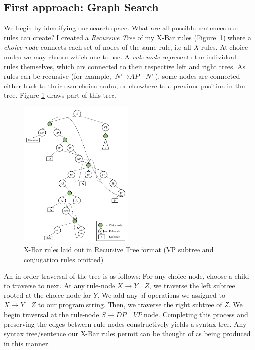 \documentclass[runningheads]{llncs}
\begin{document}
\subsection{First approach: Graph Search}
We begin by identifying our search space. What are all possible sentences our rules can create? I created a \textit{Recursive Tree} of my X-Bar rules (Figure~\ref{fig:rule-tree}) where a \textit{choice-node} connects each set of nodes of the same rule, i.e all $X$ rules. At choice-nodes we may choose which one to use. A \textit{rule-node} represents the individual rules themselves, which are connected to their respective left and right trees. As rules can be recursive (for example, $\textit{N'} \rightarrow \textit{AP} \quad \textit{N'}$), some nodes are connected either back to their own choice nodes, or elsewhere to a previous position in the tree. Figure \ref{fig:rule-tree} draws part of this tree.

\begin{figure}
  \centering
  \includegraphics[width=0.5\textwidth]{X-Bar Rule Tree}
	\caption{X-Bar rules laid out in Recursive Tree format (VP subtree and conjugation rules omitted)}
  \label{fig:rule-tree}
\end{figure}

An in-order traversal of the tree is as follows: For any choice node, choose a child to traverse to next. At any rule-node $X \rightarrow Y \quad Z$, we traverse the left subtree rooted at the choice node for $Y$. We add any bf operations we assigned to $X \rightarrow Y \quad Z$ to our program string. Then, we traverse the right subtree of $Z$. We begin traversal at the rule-node $S \rightarrow DP \quad VP$ node. Completing this process and preserving the edges between rule-nodes constructively yields a syntax tree. Any syntax tree/sentence our X-Bar rules permit can be thought of as being produced in this manner.
\end{document}
